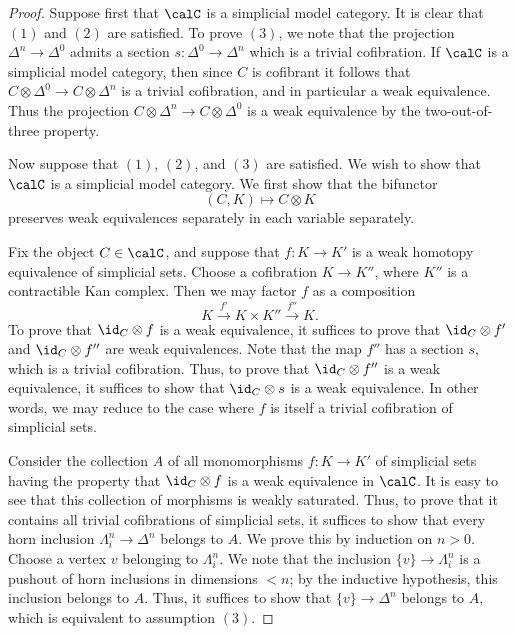 \begin{proof}
Suppose first that $\calC$ is a simplicial model category. It is clear that $(1)$ and $(2)$ are satisfied. To prove $(3)$, we note that the projection $\Delta^n \rightarrow \Delta^0$ admits a section $s: \Delta^0 \rightarrow \Delta^n$ which is a trivial cofibration. If $\calC$ is a simplicial model category, then since $C$ is cofibrant it follows
that $C \otimes \Delta^0 \rightarrow C \otimes \Delta^n$ is a trivial cofibration, and in particular a weak equivalence. Thus the projection
$C \otimes \Delta^n \rightarrow C \otimes \Delta^0$ is a weak equivalence by the two-out-of-three property.

Now suppose that $(1)$, $(2)$, and $(3)$ are satisfied. We wish to show that $\calC$ is a simplicial model category. 
We first show that the bifunctor
$$ (C,K) \mapsto C \otimes K$$
preserves weak equivalences separately in each variable separately.

Fix the object $C \in \calC$, and suppose that $f: K \rightarrow K'$ is a weak homotopy equivalence of simplicial sets. Choose a cofibration $K \rightarrow K''$, where $K''$ is a contractible Kan complex. Then we may factor $f$ as a composition
$$ K \stackrel{f'}{\rightarrow} K \times K'' \stackrel{f''}{\rightarrow} K.$$
To prove that $\id_{C} \otimes f$ is a weak equivalence, it suffices to prove that
$\id_{C} \otimes f'$ and $\id_{C} \otimes f''$ are weak equivalences. Note that the map
$f''$ has a section $s$, which is a trivial cofibration. Thus, to prove that $\id_{C} \otimes f''$ is a weak equivalence, it suffices to show that $\id_{C} \otimes s$ is a weak equivalence. In other words, we may reduce to the case where $f$ is itself a trivial cofibration of simplicial sets.

Consider the collection $A$ of all monomorphisms $f: K \rightarrow K'$ of simplicial sets having the property that $\id_{C} \otimes f$ is a weak equivalence in $\calC$. It is easy to see that this collection of morphisms is weakly saturated. Thus, to prove that it contains all trivial cofibrations of simplicial sets, it suffices to show that every horn inclusion $\Lambda^n_i \rightarrow \Delta^n$
belongs to $A$. We prove this by induction on $n > 0$. Choose a vertex $v$ belonging to
$\Lambda^n_i$. We note that the inclusion $\{v\} \rightarrow \Lambda^n_i$ is a pushout of horn inclusions in dimensions $< n$; by the inductive hypothesis, this inclusion belongs to $A$.
Thus, it suffices to show that $\{v\} \rightarrow \Delta^n$ belongs to $A$, which is equivalent to assumption $(3)$.


\end{proof}
